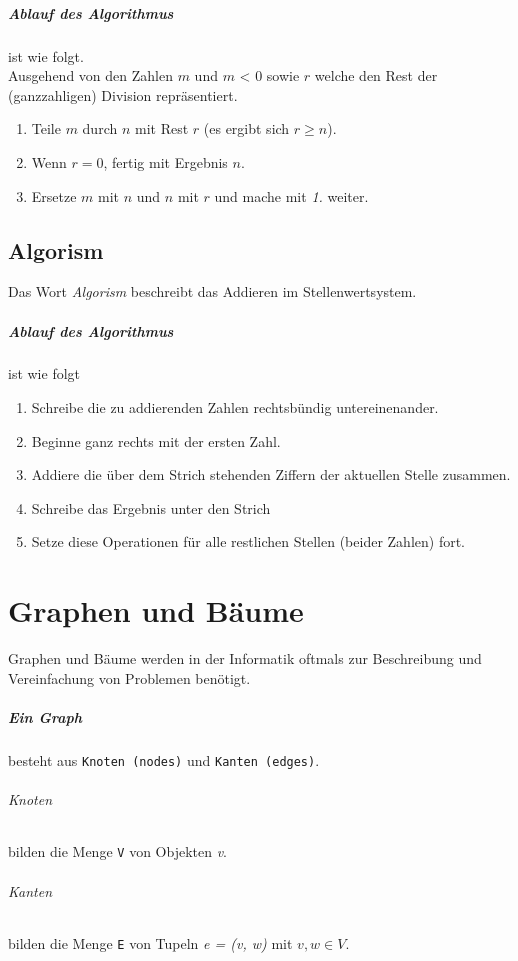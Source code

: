 \documentclass{book}
\begin{document}
\paragraph*{Ablauf des Algorithmus} ist wie folgt. \\
Ausgehend von den Zahlen $m$ und $m$ < 0 sowie $r$ welche den Rest der (ganzzahligen) Division repräsentiert.
\begin{enumerate}
	\item Teile $m$ durch $n$ mit Rest $r$ (es ergibt sich $r \geq n$).
	\item Wenn $r = 0$, fertig mit Ergebnis $n$.
	\item Ersetze $m$ mit $n$ und $n$ mit $r$ und mache mit \textit{1.} weiter.
\end{enumerate}
\section{Algorism}
Das Wort \textit{Algorism} beschreibt das Addieren im Stellenwertsystem.
\paragraph*{Ablauf des Algorithmus} ist wie folgt
\begin{enumerate}
	\item Schreibe die zu addierenden Zahlen rechtsbündig untereinenander.
	\item Beginne ganz rechts mit der ersten Zahl.
	\item Addiere die über dem Strich stehenden Ziffern der aktuellen Stelle zusammen.
	\item Schreibe das Ergebnis unter den Strich
	\item Setze diese Operationen für alle restlichen Stellen (beider Zahlen) fort.
\end{enumerate}
\chapter{Graphen und Bäume}
Graphen und Bäume werden in der Informatik oftmals zur Beschreibung und Vereinfachung von  Problemen benötigt.
\paragraph*{Ein Graph} besteht aus \texttt{Knoten (nodes)} und \texttt{Kanten (edges)}.
\subparagraph*{Knoten} bilden die Menge \texttt{V} von Objekten \textit{v}.
\subparagraph*{Kanten} bilden die Menge \texttt{E} von Tupeln \textit{e = (v, w)} mit $v,w \in V$. 
\end{document}
